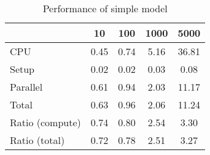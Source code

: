 \begin{table}[!h]
\centering
\caption{Performance of simple model}
\begin{tabular}{l*{4}{c}}\hline
& 10 &             100 &            1000 &            5000 \\ \hline
CPU &     0.45 &      0.74 &      5.16 &     36.81 \\
Setup &     0.02 &      0.02 &      0.03 &      0.08 \\
Parallel &     0.61 &      0.94 &      2.03 &     11.17 \\
Total &     0.63 &      0.96 &      2.06 &     11.24 \\
Ratio (compute) &     0.74 &      0.80 &      2.54 &      3.30 \\
Ratio (total) &     0.72 &      0.78 &      2.51 &      3.27 \\
\hline
\end{tabular}
\end{table}
